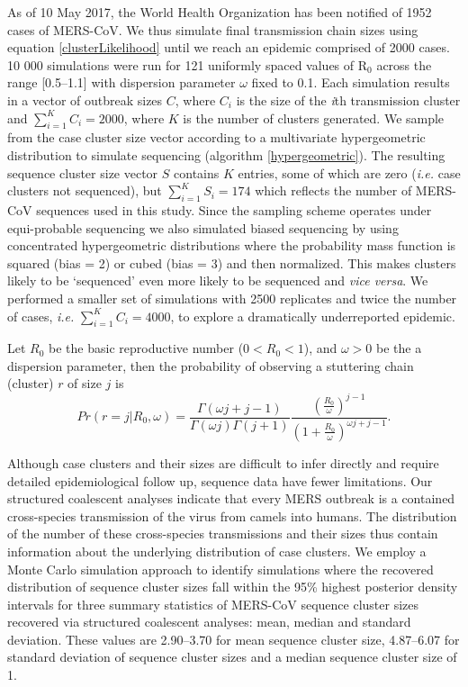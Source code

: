 \documentclass[11pt,oneside,letterpaper]{article}
\def\gdc#1{\textcolor{blue}{[#1]}}
\def\lmc#1{\textcolor{green}{[#1]}}
\begin{document}
As of 10 May 2017, the World Health Organization has been notified of 1952 cases of MERS-CoV.
We thus simulate final transmission chain sizes using equation \ref{clusterLikelihood} \citep{lloyd-smith_superspreading_2005,blumberg_inference_2013} until we reach an epidemic comprised of 2000 cases.
10 000 simulations were run for 121 uniformly spaced values of R$_{0}$ across the range [0.5--1.1] with dispersion parameter $\omega$ fixed to 0.1.
Each simulation results in a vector of outbreak sizes $C$, where $C_{i}$ is the size of the \textit{i}th transmission cluster and $\sum_{i=1}^{K} C_{i} = 2000$, where $K$ is the number of clusters generated.
We sample from the case cluster size vector according to a multivariate hypergeometric distribution to simulate sequencing (algorithm \ref{hypergeometric}).
The resulting sequence cluster size vector $S$ contains $K$ entries, some of which are zero (\textit{i.e.} case clusters not sequenced), but $\sum_{i=1}^{K} S_{i} = 174$ which reflects the number of MERS-CoV sequences used in this study.
Since the sampling scheme operates under equi-probable sequencing we also simulated biased sequencing by using concentrated hypergeometric distributions where the probability mass function is squared (bias = 2) or cubed (bias = 3) and then normalized.
This makes clusters likely to be `sequenced' even more likely to be sequenced and \textit{vice versa}.
We performed a smaller set of simulations with 2500 replicates and twice the number of cases, \textit{i.e.} $\sum_{i=1}^{K} C_{i} = 4000$, to explore a dramatically underreported epidemic.

Let $R_{0}$ be the basic reproductive number ($ 0 < R_{0} < 1$),  and $\omega > 0$ be the a dispersion parameter, then the probability of observing a stuttering chain (cluster) $r$ of size $j$ is~\citep{blumberg_inference_2013}
\begin{equation}
Pr(r = j | R_{0}, \omega) = \frac{\Gamma(\omega j+j-1)}{\Gamma(\omega j)\Gamma(j+1)} \frac{(\frac{R_{0}}{\omega})^{j-1}}{(1+\frac{R_{0}}{\omega})^{\omega j+j-1}}.
\label{clusterLikelihood}
\end{equation}

Although case clusters and their sizes are difficult to infer directly and require detailed epidemiological follow up, sequence data have fewer limitations.%
Our structured coalescent analyses indicate that every MERS outbreak is a contained cross-species transmission of the virus from camels into humans.
The distribution of the number of these cross-species transmissions and their sizes thus contain information about the underlying distribution of case clusters.
We employ a Monte Carlo simulation approach to identify simulations where the recovered distribution of sequence cluster sizes fall within the 95\% highest posterior density intervals for three summary statistics of MERS-CoV sequence cluster sizes recovered via structured coalescent analyses: mean, median and standard deviation.
These values are 2.90--3.70 for mean sequence cluster size, 4.87--6.07 for standard deviation of sequence cluster sizes and a median sequence cluster size of 1.
\end{document}
